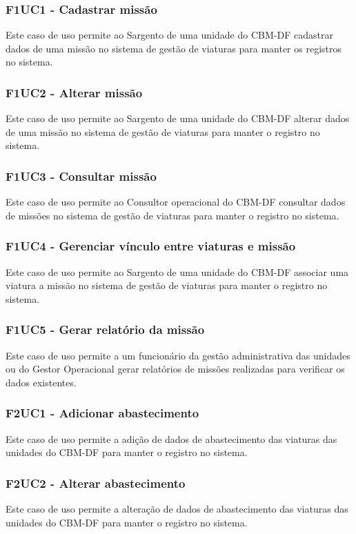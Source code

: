 \subsubsection{F1UC1 - Cadastrar missão}
Este caso de uso permite ao Sargento de uma unidade do CBM-DF cadastrar dados de uma missão no sistema de gestão de viaturas para
manter os registros no sistema.

  \subsubsection{F1UC2 - Alterar missão}
Este caso de uso permite ao Sargento de uma unidade do CBM-DF alterar dados de uma missão no sistema de gestão de viaturas
para manter o registro no sistema.

  \subsubsection{F1UC3 - Consultar missão}
Este caso de uso permite ao Consultor operacional do CBM-DF consultar dados de missões no sistema de gestão de viaturas para
manter o registro no sistema.

  \subsubsection{F1UC4 - Gerenciar vínculo entre viaturas e missão}
Este caso de uso permite ao Sargento de uma unidade do CBM-DF associar uma viatura a missão no sistema de gestão de viaturas 
para manter o registro no sistema.

  \subsubsection{F1UC5 - Gerar relatório da missão}
Este caso de uso permite a um funcionário da gestão administrativa das unidades ou do Gestor Operacional gerar relatórios de
missões realizadas para verificar os dados existentes.

  \subsubsection{F2UC1 - Adicionar abastecimento}
Este caso de uso permite a adição de dados de abastecimento das viaturas das unidades do CBM-DF para manter o registro no sistema.

  \subsubsection{F2UC2 - Alterar abastecimento}
Este caso de uso permite a alteração de dados de abastecimento das viaturas das unidades do CBM-DF para manter o registro no sistema.

